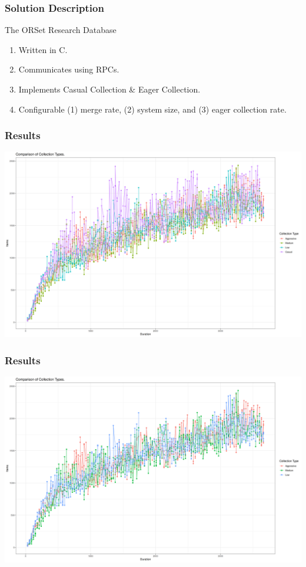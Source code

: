 \documentclass{beamer}
\begin{document}
    \begin{frame}
        \frametitle{Solution Description}
        The ORSet Research Database

        \begin{enumerate}
        \item Written in C.
        \item Communicates using RPCs.
        \item Implements Casual Collection \& Eager Collection.
        \item Configurable (1) merge rate, (2) system size, and (3) eager
            collection rate.
        \end{enumerate}
    \end{frame}


    \begin{frame}
        \frametitle{Results}
        \includegraphics[width=\textwidth]{CollectionType1}
    \end{frame}
    \begin{frame}
        \frametitle{Results}
        \includegraphics[width=\textwidth]{CollectionType2}
    \end{frame}
\end{document}
